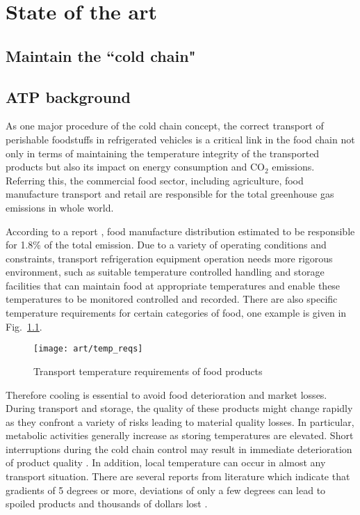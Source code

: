 \chapter{State of the art}     %
\section*{Maintain the ``cold chain"}

\section{ATP background}
As one major procedure of the cold chain concept, the correct transport of perishable foodstuffs in refrigerated vehicles is a critical link in the food chain not only in terms of maintaining the temperature integrity of the transported products but also its impact on energy consumption and CO$_2$ emissions. Referring this, the  commercial food sector, including agriculture, food manufacture transport and retail are responsible for the total greenhouse gas emissions in whole world.

According to a report \citep{watkiss2005validity}, food manufacture distribution estimated to be responsible for 1.8\% of the total emission. Due to a variety of operating conditions and constraints, transport refrigeration equipment operation needs more rigorous environment, such as suitable temperature controlled handling and storage facilities that can maintain food at appropriate temperatures and enable these temperatures to be monitored controlled and recorded. There are also specific temperature requirements for certain categories of food, one example is given in Fig.~\ref{tem_reqs}. %
\begin{figure}[ht]
	\centering
	\texttt{[image: art/temp\_reqs]}
	\label{tem_reqs}
	\caption{Transport temperature requirements of food products}
\end{figure}

Therefore cooling is essential to avoid food deterioration and market losses.  During transport and storage, the quality of these products might change rapidly as they confront a variety of risks leading to material quality losses. In particular, metabolic activities generally increase as storing temperatures are elevated. Short interruptions during the cold chain control may result in immediate deterioration of product quality \citep{Nunes2003Quality}. In addition, local temperature can occur in almost any transport situation. There are several reports from literature which indicate that gradients of 5 degrees or more, deviations of only a few degrees can lead to spoiled products and thousands of dollars lost \citep{Tanner2003Modelling, Nunes2006Brief, Rodriguez-Bermejo2007Thermal}.

